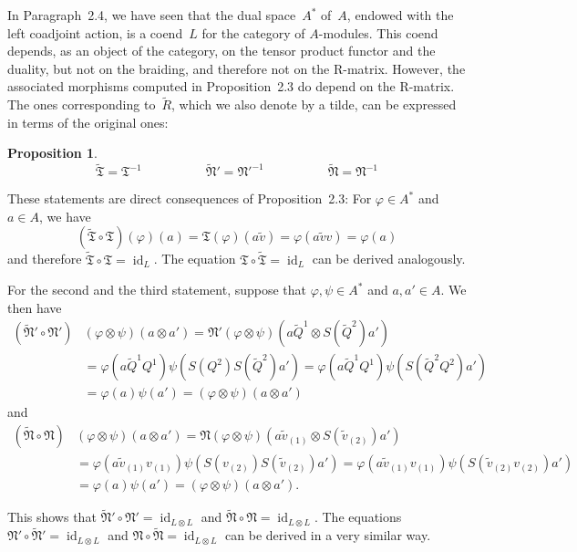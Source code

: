 \documentclass[12pt]{article}
\makeatletter
\theoremstyle{definition}
\newtheorem{Proposition}[Satz]{Proposition}
\theoremstyle{break}
\renewenvironment{proof}[1][\proofname]{\par
\vspace{-5pt}%
\pushQED{\qed}%
\normalfont
\topsep0pt \partopsep0pt %
\trivlist
\item[\hskip\labelsep
\bfseries
#1\@addpunct{.}]\ignorespaces
}{%
\popQED\endtrivlist\@endpefalse
\addvspace{6pt plus 6pt} %
}
\DeclareMathOperator\id{id}
\newcommand{\fT}{\mathfrak{T}}
\newcommand{\fN}{\mathfrak{N}}
\renewcommand{\1}{\mathbbm{1}}
\newcommand{\ot}{\mathbin{\otimes}}
\makeatother
\begin{document}
In Paragraph~2.4, we have seen that the dual space~$A^*$ of~$A$, endowed with the left coadjoint action, is a coend~$L$ for the category of $A$-modules. This coend depends, as an object of the category, on the tensor product functor and the duality, but not on the braiding, and therefore not on the R-matrix. However, the associated morphisms computed in Proposition~2.3 do depend on the R-matrix. The ones corresponding to~$\tilde{R}$, which we also denote by a tilde, can be expressed in terms of the original ones:
\begin{Proposition} \label{PropAltRMat}
\[\tilde{\fT} = \fT^{-1} \qquad \qquad \quad \tilde{\fN}' = \fN'^{-1} \qquad \qquad \quad 
\tilde{\fN} = \fN^{-1}\]

\end{Proposition}
\begin{proof}
\begin{parlist}
\item
These statements are direct consequences of Proposition~2.3: For $\varphi \in A^*$ and $a \in A$, we have
\[(\tilde{\fT} \circ \fT)(\varphi)(a) = \fT(\varphi)(a \tilde{v})
= \varphi(a \tilde{v} v) = \varphi(a)\]
and therefore $\tilde{\fT} \circ \fT = \id_L$. The equation
$\fT \circ \tilde{\fT} = \id_L$ can be derived analogously.

\item
For the second and the third statement, suppose that $\varphi, \psi \in A^*$ and $a,a' \in A$. We then have
\begin{align*}
(\tilde{\fN}' \circ \fN')&(\varphi \ot \psi)(a \ot a') =
\fN'(\varphi \ot \psi)(a \tilde{Q}^1 \ot S(\tilde{Q}^2) a') \\
&= \varphi(a \tilde{Q}^1 Q^1) \psi(S(Q^2) S(\tilde{Q}^2) a')
= \varphi(a \tilde{Q}^1 Q^1) \psi(S(\tilde{Q}^2 Q^2) a') \\
&= \varphi(a) \psi(a') = (\varphi \ot \psi)(a \ot a')
\end{align*}
and
\begin{align*}
(\tilde{\fN} \circ \fN)&(\varphi \ot \psi)(a \ot a') =
\fN(\varphi \ot \psi)(a \tilde{v}_{(1)} \ot S(\tilde{v}_{(2)}) a') \\
&= \varphi(a \tilde{v}_{(1)} v_{(1)}) \psi(S(v_{(2)}) S(\tilde{v}_{(2)}) a')
= \varphi(a \tilde{v}_{(1)} v_{(1)}) \psi(S(\tilde{v}_{(2)} v_{(2)}) a') \\
&= \varphi(a) \psi(a') = (\varphi \ot \psi)(a \ot a').
\end{align*}

This shows that $\tilde{\fN}' \circ \fN' = \id_{L \ot L}$ and
$\tilde{\fN} \circ \fN = \id_{L \ot L}$. The equations
$\fN' \circ \tilde{\fN}' = \id_{L \ot L}$ and $\fN \circ \tilde{\fN} = \id_{L \ot L}$
can be derived in a very similar way.
\qedhere
\end{parlist}
\end{proof}
\end{document}
